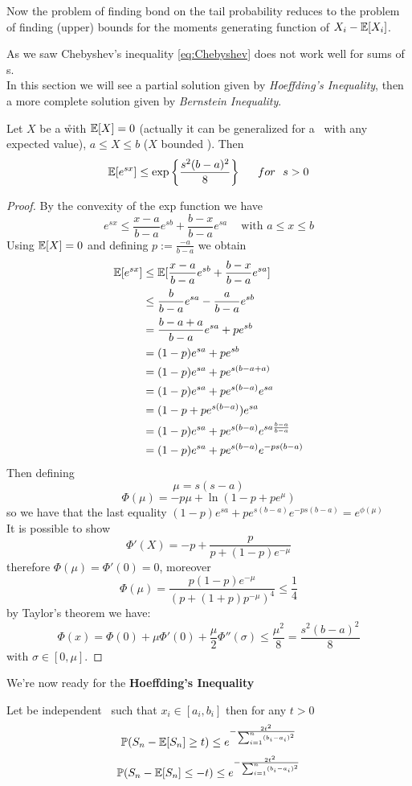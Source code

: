 Now the problem of finding bond on the tail probability reduces to the problem of finding (upper) bounds for the moments generating function of $X_i-\mathbb{E}[X_i]$.


As we saw Chebyshev's inequality \ref{eq:Chebyshev} does not work well for sums of \rv s.\\
In this section we will see a partial solution given by \textit{Hoeffding's Inequality}, then a more complete solution given by \textit{Bernstein Inequality}.

\begin{lem}\label{lem:Hoeffding}
	Let $X$ be a \r with $\mathbb{E} [X]=0$ (actually it can be generalized for a \rv \  with any expected value), $a\leq X \leq b$ ($X$ bounded \rv). Then
	\[
	\e[e^{sx}] \leq \exp \bigg\{\frac{s^2(b-a)^2}{8} \bigg\}\ \ \ \ \ for  \ \ s>0
	\]
\end{lem}

\begin{proof}
	By the convexity of the exp function we have 
	\[
	e^{sx} \leq \frac{x-a}{b-a}e^{sb}+\frac{b-x}{b-a}e^{sa} \ \ \ \  \text{     with $a\leq x\leq b$}
	\]
	Using $\mathbb{E}[X]=0$ and defining $p:=\frac{-a}{b-a}$ we obtain
	\[
	\begin{split}
		\mathbb{E}[e^{sx}]
		&\leq \mathbb{E}[\frac{x-a}{b-a}e^{sb}+\frac{b-x}{b-a}e^{sa} ]\\
		& \leq \frac{b}{b-a}e^{sa}-\frac{a}{b-a}e^{sb}\\
		& =\frac{b-a+a}{b-a}e^{sa}+pe^{sb}\\
		&= (1-p)e^{sa}+pe^{sb}\\
		&= (1-p)e^{sa}+pe^{s(b-a+a)}\\
		&= (1-p)e^{sa}+pe^{s(b-a)}e^{sa}\\
		&= (1-p+pe^{s(b-a)})e^{sa}\\
		&= (1-p)e^{sa}+pe^{s(b-a)}e^{sa\frac{b-a}{b-a}}\\
		&= (1-p)e^{sa}+pe^{s(b-a)}e^{-ps(b-a)}\\
	\end{split}
	\]
	Then defining 
	$$\mu=s(s-a)$$
	$$\Phi(\mu)=-p\mu + \ln(1-p+pe^{\mu})$$
	so we have that the last equality $(1-p)e^{sa}+pe^{s(b-a)}e^{-ps(b-a)}=e^{\phi(\mu)}$\\
	It is possible to show 
	$$\Phi'(X)=-p +\frac{p}{p+(1-p)e^{-\mu}}$$
	therefore $\Phi(\mu)=\Phi'(0)=0$, moreover
	$$\Phi(\mu)=\frac{p(1-p)e^{-\mu}}{(p+(1+p)p^{-\mu})^4}\leq \frac{1}{4}$$
	by Taylor's theorem we have:
	$$\Phi(x)=\Phi(0)+\mu\Phi'(0)+\frac{\mu}{2}\Phi''(\sigma)\leq \frac{\mu^2}{8}=\frac{s^2(b-a)^2}{8}$$
	with $\sigma \in [0,\mu]$.
\end{proof}
We're now ready for the \textbf{Hoeffding's Inequality}
\begin{teo}
	Let \xii be independent \rv \ such that $x_i\in[a_i,b_i]$ then for any $t>0$
	$$\mathbb{P}(S_n-\mathbb{E}[S_n]\geq t)\leq e^{-\frac{2t^2}{\sum_{i=1}^{n}(b_i-a_i)^2}}$$
	$$\mathbb{P}(S_n-\mathbb{E}[S_n]\leq -t)\leq e^{-\frac{2t^2}{\sum_{i=1}^{n}(b_i-a_i)^2}}$$
\end{teo}


